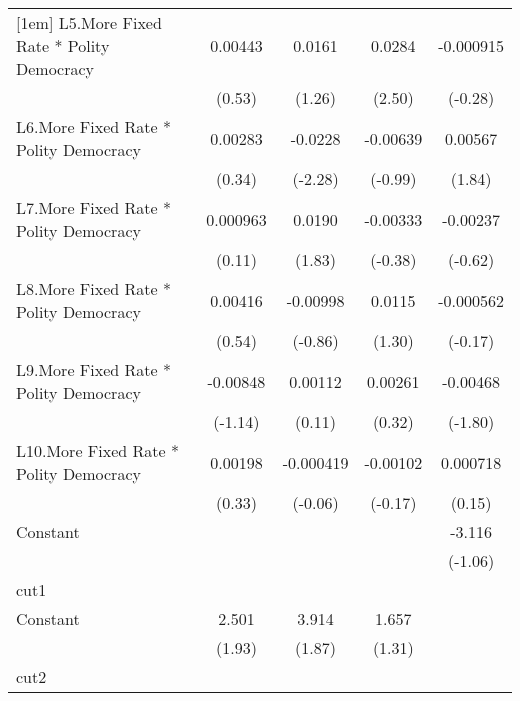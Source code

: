 {\begin{longtable}{l*{4}{c}}
[1em]
L5.More Fixed Rate * Polity Democracy&  0.00443         &   0.0161         &   0.0284\sym{*}  &-0.000915         \\
                &   (0.53)         &   (1.26)         &   (2.50)         &  (-0.28)         \\
[1em]
L6.More Fixed Rate * Polity Democracy&  0.00283         &  -0.0228\sym{*}  & -0.00639         &  0.00567         \\
                &   (0.34)         &  (-2.28)         &  (-0.99)         &   (1.84)         \\
[1em]
L7.More Fixed Rate * Polity Democracy& 0.000963         &   0.0190         & -0.00333         & -0.00237         \\
                &   (0.11)         &   (1.83)         &  (-0.38)         &  (-0.62)         \\
[1em]
L8.More Fixed Rate * Polity Democracy&  0.00416         & -0.00998         &   0.0115         &-0.000562         \\
                &   (0.54)         &  (-0.86)         &   (1.30)         &  (-0.17)         \\
[1em]
L9.More Fixed Rate * Polity Democracy& -0.00848         &  0.00112         &  0.00261         & -0.00468         \\
                &  (-1.14)         &   (0.11)         &   (0.32)         &  (-1.80)         \\
[1em]
L10.More Fixed Rate * Polity Democracy&  0.00198         &-0.000419         & -0.00102         & 0.000718         \\
                &   (0.33)         &  (-0.06)         &  (-0.17)         &   (0.15)         \\
[1em]
Constant        &                  &                  &                  &   -3.116         \\
                &                  &                  &                  &  (-1.06)         \\
\hline
cut1            &                  &                  &                  &                  \\
Constant        &    2.501         &    3.914         &    1.657         &                  \\
                &   (1.93)         &   (1.87)         &   (1.31)         &                  \\
\hline
cut2            &                  &                  &                  &                  \\

\end{longtable}}

